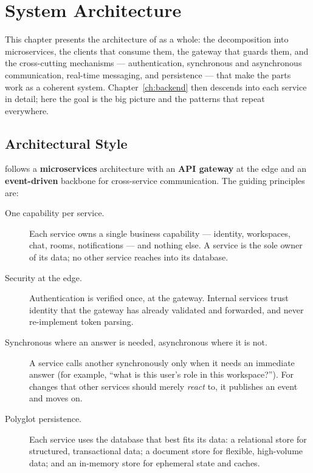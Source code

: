 \chapter{System Architecture}
\label{ch:architecture}

This chapter presents the architecture of \voname{} as a whole: the decomposition
into microservices, the clients that consume them, the gateway that guards them,
and the cross-cutting mechanisms --- authentication, synchronous and asynchronous
communication, real-time messaging, and persistence --- that make the parts work
as a coherent system. Chapter~\ref{ch:backend} then descends into each service in
detail; here the goal is the big picture and the patterns that repeat everywhere.

\section{Architectural Style}

\voname{} follows a \textbf{microservices} architecture with an \textbf{API
gateway} at the edge and an \textbf{event-driven} backbone for cross-service
communication. The guiding principles are:

\begin{description}
  \item[One capability per service.] Each service owns a single business
  capability --- identity, workspaces, chat, rooms, notifications --- and nothing
  else. A service is the sole owner of its data; no other service reaches into
  its database.
  \item[Security at the edge.] Authentication is verified once, at the gateway.
  Internal services trust identity that the gateway has already validated and
  forwarded, and never re-implement token parsing.
  \item[Synchronous where an answer is needed, asynchronous where it is not.]
  A service calls another synchronously only when it needs an immediate
  answer (for example, ``what is this user's role in this workspace?''). For
  changes that other services should merely \emph{react} to, it publishes an
  event and moves on.
  \item[Polyglot persistence.] Each service uses the database that best fits its
  data: a relational store for structured, transactional data; a document store
  for flexible, high-volume data; and an in-memory store for ephemeral state and
  caches.
\end{description}

